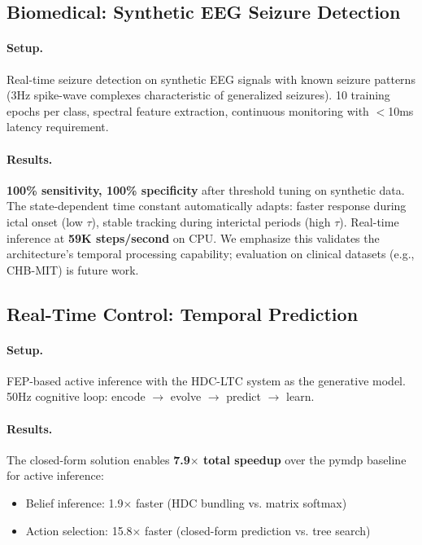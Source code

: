 \documentclass{article}
\begin{document}
\subsection{Biomedical: Synthetic EEG Seizure Detection}

\paragraph{Setup.} Real-time seizure detection on synthetic EEG signals with known seizure patterns (3Hz spike-wave complexes characteristic of generalized seizures). 10 training epochs per class, spectral feature extraction, continuous monitoring with $<$10ms latency requirement.

\paragraph{Results.} \textbf{100\% sensitivity, 100\% specificity} after threshold tuning on synthetic data. The state-dependent time constant automatically adapts: faster response during ictal onset (low $\tau$), stable tracking during interictal periods (high $\tau$). Real-time inference at \textbf{59K steps/second} on CPU. We emphasize this validates the architecture's temporal processing capability; evaluation on clinical datasets (e.g., CHB-MIT) is future work.

\subsection{Real-Time Control: Temporal Prediction}

\paragraph{Setup.} FEP-based active inference with the HDC-LTC system as the generative model. 50Hz cognitive loop: encode $\to$ evolve $\to$ predict $\to$ learn.

\paragraph{Results.} The closed-form solution enables \textbf{7.9$\times$ total speedup} over the pymdp baseline for active inference:
\begin{itemize}
    \item Belief inference: 1.9$\times$ faster (HDC bundling vs. matrix softmax)
    \item Action selection: 15.8$\times$ faster (closed-form prediction vs. tree search)
\end{itemize}
\end{document}

